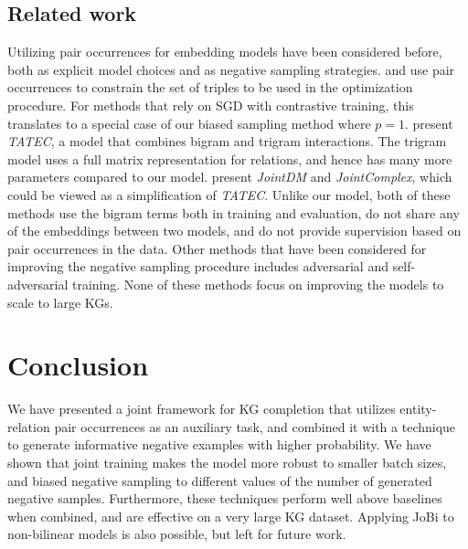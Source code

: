 \documentclass[11pt,a4paper, dvipsnames]{article}
\begin{document}
 \subsection{Related work} Utilizing pair occurrences for embedding models have been considered before, both as explicit model choices and as negative sampling strategies. \citet{chang2014typed} and \citet{Krompa2015Type-constrainedGraphs} use pair occurrences to constrain the set of triples to be used in the optimization procedure.
 For methods that rely on SGD with contrastive training, this translates to a special case of our biased sampling method where $p = 1$.  
 \citet{Garcia-Duran2016CombiningBases} present \textit{TATEC}, a model that combines bigram and trigram interactions. 
The trigram model uses a full matrix representation for relations, and hence has many more parameters compared to our model. \citet{Jain2018Type-SensitiveSupervision} present \textit{JointDM} and \textit{JointComplex}, which could be viewed as a simplification of \textit{TATEC}.
Unlike our model, both of these methods use the bigram terms both in training and evaluation, do not share any of the embeddings between two models, and do not provide supervision based on pair occurrences in the data. Other methods that have been considered for improving the negative sampling procedure includes adversarial \citep{cai2018kbgan} and self-adversarial \citep{sun2018rotate} training. None of these methods focus on improving the models to scale to large KGs. 

\section{Conclusion}

We have presented a joint framework for KG completion that utilizes entity-relation pair occurrences as an auxiliary task, and combined it with a technique to generate informative negative examples with higher probability. We have shown that joint training makes the model more robust to smaller batch sizes, and biased negative sampling to different values of the number of generated negative samples. Furthermore, these techniques perform well above baselines when combined, and are effective on a very large KG dataset. Applying JoBi to non-bilinear models is also possible, but left for future work.



\newpage

\appendix
\end{document}
